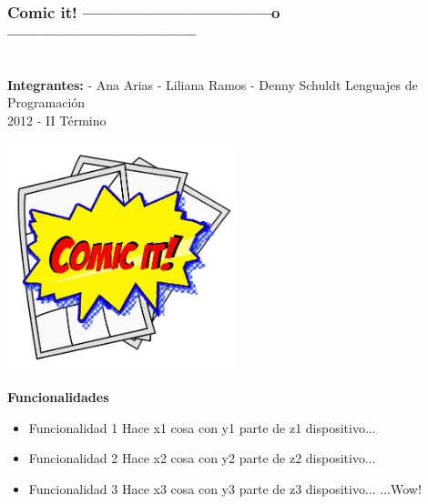 \documentclass[utf8]{beamer}
\author{Ana, Liliana, Denny}
\begin{document}
	\begin{frame}
		\frametitle{
			\color{black}\textbf{Comic it!}
			\color{gray}---------------------------------o---------------------------------
		}	
	 	\begin{multicols}{2}
		    	\begingroup
				\begin{center} 
					\begingroup
						\textbf{\\Integrantes:}
					\endgroup
					\newline
					\newline
					- Ana Arias
					\newline
					- Liliana Ramos
					\newline
					- Denny Schuldt
					\newline
					\newline
					Lenguajes de Programación
					\\2012 - II Término
				\end{center} 
			\endgroup
			\pause
			\begin{center} 
				 \includegraphics[width=0.5\textwidth]{comicit.jpg} %
			\end{center} 
			\end{multicols}
	\end{frame}
	\begin{frame}
		\textbf{Funcionalidades}
		\newline
		\begin{itemize}
			\item Funcionalidad 1
			\newline
			Hace x1 cosa con y1 parte de z1 dispositivo...
			\pause
			\item Funcionalidad 2
			\newline
			Hace x2 cosa con y2 parte de z2 dispositivo...
			\pause
			\item Funcionalidad 3
			\newline
			Hace x3 cosa con y3 parte de z3 dispositivo...
			\pause
			\newline
			\newline
			\newline
			\flushright
			...Wow!
		\end{itemize}
	\end{frame}	
\end{document}

